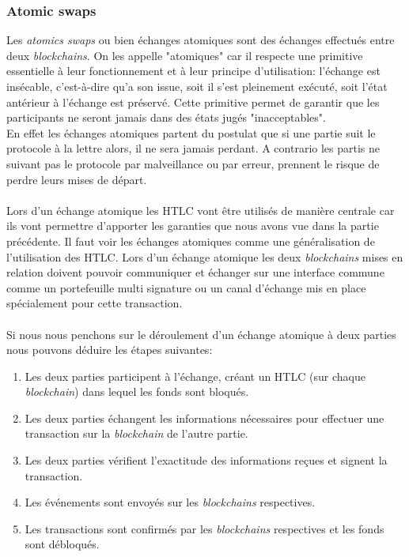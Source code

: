 \subsubsection{Atomic swaps}
Les \textit{atomics swaps} ou bien échanges atomiques sont des échanges effectués entre deux \textit{blockchains}\cite{herlihy2018atomic}. On les appelle "atomiques" car il respecte une primitive essentielle à leur fonctionnement et à leur principe d'utilisation: 
l'échange est insécable, c'est-à-dire qu'a son issue, soit il s'est pleinement exécuté, soit l'état antérieur à l'échange est préservé.
Cette primitive permet de garantir que les participants ne seront jamais dans des états jugés "inacceptables". \\
En effet les échanges atomiques partent du postulat que si une partie suit le protocole à la lettre alors, 
il ne sera jamais perdant. A contrario les partis ne suivant pas le protocole par malveillance ou par erreur, prennent le risque de perdre leurs mises de départ.\\ \\
Lors d'un échange atomique les HTLC vont être utilisés de manière centrale car ils vont permettre d'apporter les garanties que nous avons vue dans la partie précédente. Il faut voir les échanges atomiques comme une généralisation de l'utilisation des HTLC. Lors d'un échange atomique les deux \textit{blockchains} mises en relation doivent pouvoir communiquer et échanger sur une interface commune comme un portefeuille multi signature ou un canal d'échange mis en place spécialement pour cette transaction. \\ \\
Si nous nous penchons sur le déroulement d'un échange atomique à deux parties nous pouvons déduire les étapes suivantes: 
\begin{enumerate}
    \item Les deux parties participent à l'échange, créant un HTLC (sur chaque \textit{blockchain}) dans lequel les fonds sont bloqués. 
    \item Les deux parties échangent les informations nécessaires pour effectuer une transaction sur la \textit{blockchain} de l'autre partie. 
    \item Les deux parties vérifient l'exactitude des informations reçues et signent la transaction. 
    \item Les événements sont envoyés sur les \textit{blockchains} respectives. 
    \item Les transactions sont confirmés par les \textit{blockchains} respectives et les fonds sont débloqués.
\end{enumerate}


